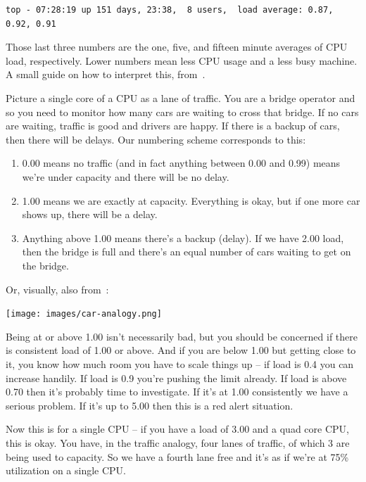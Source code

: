 \documentclass[a4paper]{report}
\begin{document}
\begin{verbatim}
top - 07:28:19 up 151 days, 23:38,  8 users,  load average: 0.87, 0.92, 0.91
\end{verbatim}

Those last three numbers are the one, five, and fifteen minute averages of CPU load, respectively. Lower numbers mean less CPU usage and a less busy machine. A small guide on how to interpret this, from~\cite{scout}.

Picture a single core of a CPU as a lane of traffic. You are a bridge operator and so you need to monitor how many cars are waiting to cross that bridge. If no cars are waiting, traffic is good and drivers are happy. If there is a backup of cars, then there will be delays. Our numbering scheme corresponds to this:

\begin{enumerate}
	\item 0.00 means no traffic (and in fact anything between 0.00 and 0.99) means we're under capacity and there will be no delay.
	\item 1.00 means we are exactly at capacity. Everything is okay, but if one more car shows up, there will be a delay.
	\item Anything above 1.00 means there's a backup (delay). If we have 2.00 load, then the bridge is full and there's an equal number of cars waiting to get on the bridge. 
\end{enumerate}

Or, visually, also from~\cite{scout}:

\begin{center}
	\texttt{[image: images/car-analogy.png]}
\end{center}

Being at or above 1.00 isn't necessarily bad, but you should be concerned if there is consistent load of 1.00 or above. And if you are below 1.00 but getting close to it, you know how much room you have to scale things up -- if load is 0.4 you can increase handily. If load is 0.9 you're pushing the limit already. If load is above 0.70 then it's probably time to investigate. If it's at 1.00 consistently we have a serious problem. If it's up to 5.00 then this is a red alert situation.

Now this is for a single CPU -- if you have a load of 3.00 and a quad core CPU, this is okay. You have, in the traffic analogy, four lanes of traffic, of which 3 are being used to capacity. So we have a fourth lane free and it's as if we're at 75\% utilization on a single CPU.
\end{document}
